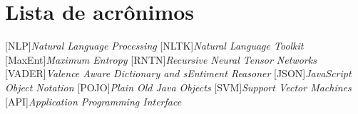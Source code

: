 \documentclass[
	12pt,				%
	openright,			%
	twoside,			%
	a4paper,			%
	english,			%
	french,				%
	spanish,			%
	brazil				%
	]{abntex2}
\begin{document}
\frenchspacing 


\imprimircapa

\imprimirfolhaderosto*

% 

%

%

%

%


\cleardoublepage
{}
\listoffigures*
\cleardoublepage

\listoftables*
\cleardoublepage

\chapter*{Lista de acrônimos}

\vspace{20px}
\begin{acronym}[XXXXXXXXXX]
[NLP]{\textit{Natural Language Processing}}
[NLTK]{\textit{Natural Language Toolkit}}
[MaxEnt]{\textit{Maximum Entropy}}
[RNTN]{\textit{Recursive Neural Tensor Networks}}
[VADER]{\textit{Valence Aware Dictionary and sEntiment Reasoner}}
[JSON]{\textit{JavaScript Object Notation}}
[POJO]{\textit{Plain Old Java Objects}}
[SVM]{\textit{Support Vector Machines}}
[API]{\textit{Application Programming Interface}}
\end{acronym}
\cleardoublepage
\tableofcontents*
\cleardoublepage
\end{document}
